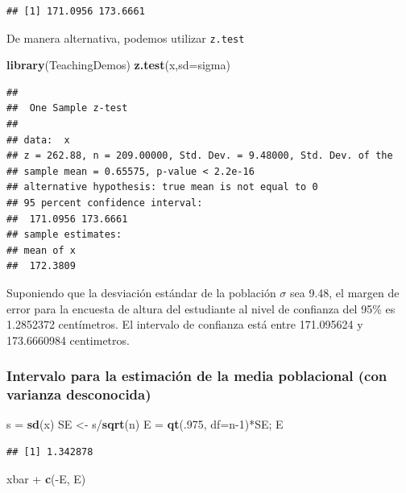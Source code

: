 \documentclass[]{article}
\newenvironment{Shaded}{\begin{snugshade}}{\end{snugshade}}
\newcommand{\KeywordTok}[1]{\textcolor[rgb]{0.13,0.29,0.53}{\textbf{{#1}}}}
\newcommand{\DataTypeTok}[1]{\textcolor[rgb]{0.13,0.29,0.53}{{#1}}}
\newcommand{\DecValTok}[1]{\textcolor[rgb]{0.00,0.00,0.81}{{#1}}}
\newcommand{\StringTok}[1]{\textcolor[rgb]{0.31,0.60,0.02}{{#1}}}
\newcommand{\NormalTok}[1]{{#1}}
\numberwithin{equation}{section}
\begin{document}
\begin{verbatim}
## [1] 171.0956 173.6661
\end{verbatim}

De manera alternativa, podemos utilizar \texttt{z.test}

\begin{Shaded}
\begin{Highlighting}[]
\KeywordTok{library}\NormalTok{(TeachingDemos)}
\KeywordTok{z.test}\NormalTok{(x,}\DataTypeTok{sd=}\NormalTok{sigma)}
\end{Highlighting}
\end{Shaded}

\begin{verbatim}
## 
##  One Sample z-test
## 
## data:  x
## z = 262.88, n = 209.00000, Std. Dev. = 9.48000, Std. Dev. of the
## sample mean = 0.65575, p-value < 2.2e-16
## alternative hypothesis: true mean is not equal to 0
## 95 percent confidence interval:
##  171.0956 173.6661
## sample estimates:
## mean of x 
##  172.3809
\end{verbatim}

Suponiendo que la desviación estándar de la población \(\sigma\) sea
9.48, el margen de error para la encuesta de altura del estudiante al
nivel de confianza del 95\% es 1.2852372 centímetros. El intervalo de
confianza está entre 171.095624 y 173.6660984 centimetros.

\subsubsection{Intervalo para la estimación de la media poblacional (con
varianza
desconocida)}\label{intervalo-para-la-estimacion-de-la-media-poblacional-con-varianza-desconocida}

\begin{Shaded}
\begin{Highlighting}[]
\NormalTok{s =}\StringTok{ }\KeywordTok{sd}\NormalTok{(x)}
\NormalTok{SE <-}\StringTok{ }\NormalTok{s/}\KeywordTok{sqrt}\NormalTok{(n)}
\NormalTok{E =}\StringTok{ }\KeywordTok{qt}\NormalTok{(.}\DecValTok{975}\NormalTok{, }\DataTypeTok{df=}\NormalTok{n}\DecValTok{-1}\NormalTok{)*SE; E}
\end{Highlighting}
\end{Shaded}

\begin{verbatim}
## [1] 1.342878
\end{verbatim}

\begin{Shaded}
\begin{Highlighting}[]
\NormalTok{xbar +}\StringTok{ }\KeywordTok{c}\NormalTok{(-E, E) }
\end{Highlighting}
\end{Shaded}
\end{document}
